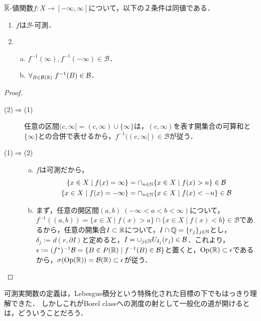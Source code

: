 \documentclass[uplatex, dvipdfmx]{jsreport}
\renewcommand{\B}{\mathcal{B}}
\begin{document}
\begin{theorem}
    $\overline{\mathbb{R}}$-値関数$f:X\to[-\infty,\infty]$について，以下の２条件は同値である．
    \begin{enumerate}
        \item $f$は$\B$-可測．
        \item \begin{enumerate}[(a)]
            \item $f^{-1}(\infty),f^{-1}(-\infty)\in\B$．
            \item $\forall_{B\in\B(\R)}\;f^{-1}(B)\in\B$．
        \end{enumerate}
    \end{enumerate}
\end{theorem}
\begin{proof}\mbox{}
    \begin{description}
        \item[(2)$\Rightarrow$(1)] 任意の区間$(c,\infty]=(c,\infty)\cup\{\infty\}$は，$(c,\infty)$を表す開集合の可算和と$\{\infty\}$との合併で表せるから，$f^{-1}((c,\infty])\in\B$が従う．
        \item[(1)$\Rightarrow$(2)] 
        \begin{enumerate}[(a)]
            \item $f$は可測だから，\begin{align*}
                \{x\in X\mid f(x)=\infty\}&=\cap_{n\in\N}\{x\in X\mid f(x)>n\}\in\B\\
                \{x\in X\mid f(x)=-\infty\}&=\cap_{n\in\N}\{x\in X\mid f(x)<-n\}\in\B
            \end{align*}
            \item まず，任意の開区間$(a,b)\;(-\infty<a<b<\infty)$について，$f^{-1}((a,b))=\{x\in X\mid f(x)>a\}\cap\{x\in X\mid f(x)<b\}\in\B$であるから，任意の開集合$I\subset\mathbb{R}$について，$I\cap\mathbb{Q}=\{r_j\}_{j\in\mathbb{N}}$とし，$\delta_j:=d(r,\partial I)$と定めると，$I=\cup_{j\in\N}U_{\delta_j}(r_j)\in\B$．これより，$\epsilon:=(f^*)^{-1}\B=\{B\in P(\R)\mid f^{-1}(B)\in\B\}$と置くと，$\mathrm{Op}(\mathbb{R})\subset\epsilon$であるから，$\sigma(\Op(\R))=\B(\R)\subset\epsilon$が従う．
        \end{enumerate}
    \end{description}
\end{proof}
\begin{remarks}
    可測実関数の定義は，Lebesgue積分という特殊化された目標の下でもはっきり理解できた．
    しかしこれがBorel classへの測度の射として一般化の道が開けるとは，どういうことだろう．
\end{remarks}
\end{document}
